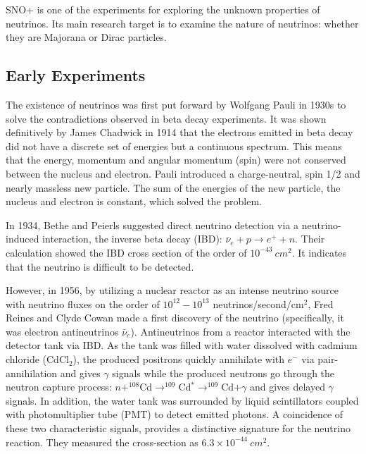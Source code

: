 \documentclass[preprint,12pt]{elsarticle}
\numberwithin{equation}{section}
\begin{document}
SNO+ is one of the experiments for exploring the unknown properties of neutrinos. Its main research target is to examine the nature of neutrinos: whether they are Majorana or Dirac particles.

\subsection{Early Experiments}
The existence of neutrinos was first put forward by Wolfgang Pauli in 1930s to solve the contradictions observed in beta decay experiments. It was shown definitively by James Chadwick in 1914 that the electrons emitted in beta decay did not have a discrete set of energies but a continuous spectrum\cite{cowanexpintro}. This means that the energy, momentum and angular momentum (spin) were not conserved between the nucleus and electron. Pauli introduced a charge-neutral, spin 1/2 and nearly massless new particle. The sum of the energies of the new particle, the nucleus and electron is constant, which solved the problem. 

In 1934, Bethe and Peierls suggested direct neutrino detection via a neutrino-induced interaction, the inverse beta decay (IBD): $\bar{\nu}_e+p\to e^+ + n$. Their calculation showed the IBD cross section of the order of $10^{-43}~cm^2$. It indicates that the neutrino is difficult to be detected\cite{bethe1}.
 
However, in 1956, by utilizing a nuclear reactor as an intense neutrino source with neutrino fluxes on the order of $10^{12}-10^{13}$ neutrinos/second/cm$^2$, Fred Reines and Clyde Cowan made a first discovery of the neutrino (specifically, it was electron antineutrinos $\bar{\nu}_e$). Antineutrinos from a reactor interacted with the detector tank via IBD. As the tank was filled with water dissolved with cadmium chloride (CdCl$_2$), the produced positrons quickly annihilate with $e^-$ via pair-annihilation and gives $\gamma$ signals while the produced neutrons go through the neutron capture process: \noindent$n+^{108}$Cd$\to ^{109}$Cd$^*\to ^{109}$Cd$ +\gamma$ and gives delayed $\gamma$ signals. In addition, the water tank was surrounded by liquid scintillators coupled with photomultiplier tube (PMT) to detect emitted photons. A coincidence of these two characteristic signals, provides a distinctive signature for the neutrino reaction. They measured the cross-section as $6.3\times10^{-44}~cm^2$.
\end{document}
